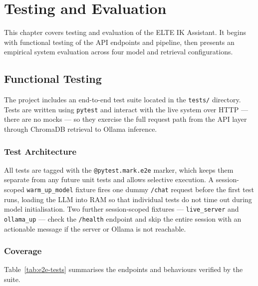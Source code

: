 \chapter{Testing and Evaluation}
\label{ch:testing}

This chapter covers testing and evaluation of the ELTE IK Assistant. It begins
with functional testing of the API endpoints and pipeline, then presents an
empirical system evaluation across four model and retrieval configurations.

\section{Functional Testing}
\label{sec:testing-functional}

The project includes an end-to-end test suite located in the \texttt{tests/}
directory. Tests are written using \texttt{pytest} and interact with the live
system over HTTP --- there are no mocks --- so they exercise the full request
path from the API layer through ChromaDB retrieval to Ollama inference.

\subsection*{Test Architecture}

All tests are tagged with the \texttt{@pytest.mark.e2e} marker, which keeps
them separate from any future unit tests and allows selective execution. A
session-scoped \texttt{warm\_up\_model} fixture fires one dummy \texttt{/chat}
request before the first test runs, loading the LLM into RAM so that individual
tests do not time out during model initialisation. Two further session-scoped
fixtures --- \texttt{live\_server} and \texttt{ollama\_up} --- check the
\texttt{/health} endpoint and skip the entire session with an actionable message
if the server or Ollama is not reachable.

\subsection*{Coverage}

Table~\ref{tab:e2e-tests} summarises the endpoints and behaviours verified by
the suite.

